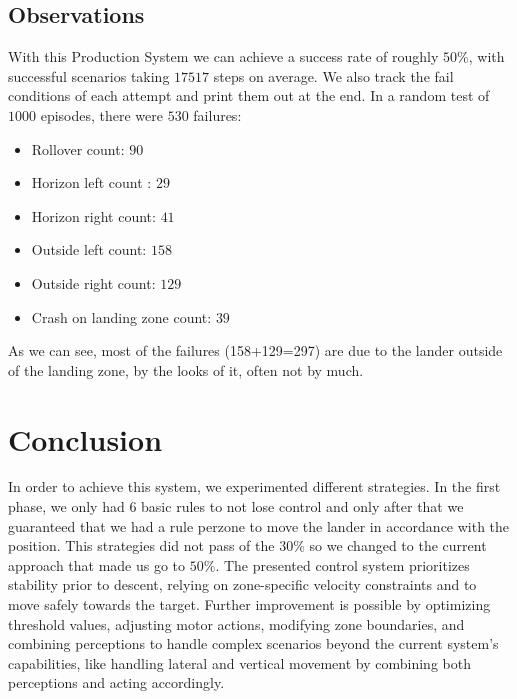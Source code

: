 \documentclass{article}
\begin{document}
\subsection{Observations}
With this Production System we can achieve a success rate of roughly $50\%$, with successful scenarios taking $17517$ steps on average. We also track the fail conditions of each attempt and print them out at the end.
In a random test of $1000$ episodes, there were $530$ failures:
\begin{itemize}
    \item Rollover count: $90$
    \item Horizon left count : $29$
    \item Horizon right count: $41$
    \item Outside left count:  $158$
    \item Outside right count: $129$
    \item Crash on landing zone count: $39$
\end{itemize}
As we can see, most of the failures (158+129=297) are due to the lander outside of the landing zone, by the looks of it, often not by much.

\section{Conclusion}
In order to achieve this system, we experimented different strategies. In the first phase, we only had 6 basic rules to not lose control and only after that we guaranteed that we had a rule perzone to move the lander in accordance with the position. This strategies did not pass of the $30\%$ so we changed to the current approach that made us go to $50\%$. The presented control system prioritizes stability prior to descent, relying on zone-specific velocity constraints and to move safely towards the target. Further improvement is possible by optimizing threshold values, adjusting motor actions, modifying zone boundaries, and combining perceptions to handle complex scenarios beyond the current system’s capabilities, like handling lateral and vertical movement by combining both perceptions and acting accordingly.
\end{document}
